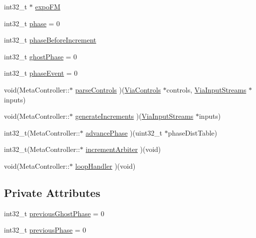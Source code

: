 \begin{DoxyCompactItemize}
\item 
int32\+\_\+t $\ast$ \mbox{\hyperlink{class_meta_controller_a8cda0eb0469d7b18682f59d9343d7c16}{expo\+FM}}
\item 
int32\+\_\+t \mbox{\hyperlink{class_meta_controller_a46db61d62388f7d72047cc188d67bddc}{phase}} = 0
\item 
int32\+\_\+t \mbox{\hyperlink{class_meta_controller_ad460161d10335de5227b5b15e523adb6}{phase\+Before\+Increment}}
\item 
int32\+\_\+t \mbox{\hyperlink{class_meta_controller_ada896e87923a5660cba1889692c67f3d}{ghost\+Phase}} = 0
\item 
int32\+\_\+t \mbox{\hyperlink{class_meta_controller_a00854d18e1394459842769c712ac1c81}{phase\+Event}} = 0
\item 
void(Meta\+Controller\+::$\ast$ \mbox{\hyperlink{class_meta_controller_a2dca0b0a40e81430fd22cbce198c2b5b}{parse\+Controls}} )(\mbox{\hyperlink{class_via_controls}{Via\+Controls}} $\ast$controls, \mbox{\hyperlink{class_via_input_streams}{Via\+Input\+Streams}} $\ast$inputs)
\item 
void(Meta\+Controller\+::$\ast$ \mbox{\hyperlink{class_meta_controller_a9cece3599531090186f2e21e26638579}{generate\+Increments}} )(\mbox{\hyperlink{class_via_input_streams}{Via\+Input\+Streams}} $\ast$inputs)
\item 
int32\+\_\+t(Meta\+Controller\+::$\ast$ \mbox{\hyperlink{class_meta_controller_a93ac4ca3a88052163f06964660408d71}{advance\+Phase}} )(uint32\+\_\+t $\ast$phase\+Dist\+Table)
\item 
int32\+\_\+t(Meta\+Controller\+::$\ast$ \mbox{\hyperlink{class_meta_controller_ab4825810085dd530123a7dcf99594780}{increment\+Arbiter}} )(void)
\item 
void(Meta\+Controller\+::$\ast$ \mbox{\hyperlink{class_meta_controller_ad7a9bfb22b8149d17e32fa5ffd0eb025}{loop\+Handler}} )(void)
\end{DoxyCompactItemize}
\subsection*{Private Attributes}
\begin{DoxyCompactItemize}
\item 
int32\+\_\+t \mbox{\hyperlink{class_meta_controller_acf1f6b23d24cae56383d278aaaf2b6d6}{previous\+Ghost\+Phase}} = 0
\item 
int32\+\_\+t \mbox{\hyperlink{class_meta_controller_afbdb66d7673f39db7b252cdc64b0175f}{previous\+Phase}} = 0
\end{DoxyCompactItemize}


